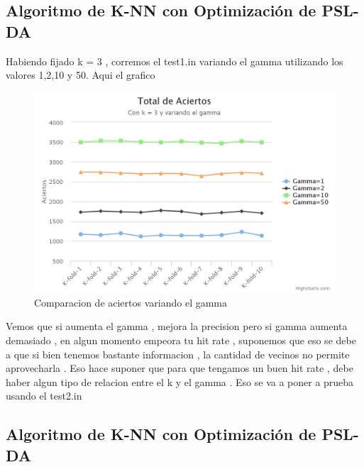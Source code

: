 \subsection {Algoritmo de K-NN con Optimización de PSL-DA}
Habiendo fijado k = 3 , corremos el test1.in variando el gamma utilizando los valores 1,2,10 y 50. Aqui el grafico
\begin{figure}[H]
\centering
\includegraphics[width=1\textwidth]{chart.jpeg}
\caption{Comparacion de aciertos variando el gamma}
\label{fig:Comparacion de tecnicas}
\end{figure}


Vemos que si aumenta el gamma , mejora la precision pero si gamma aumenta demasiado , en algun momento empeora tu hit rate , suponemos que eso se debe a que si bien tenemos bastante informacion , la cantidad de vecinos no permite aprovecharla . Eso hace suponer que para que tengamos un buen hit rate , debe haber algun tipo de relacion entre el k y el gamma . Eso se va a poner a prueba usando el test2.in

\subsection {Algoritmo de K-NN con Optimización de PSL-DA}

